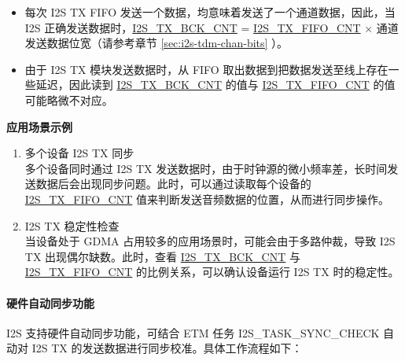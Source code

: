 \documentclass[main\_\_CN.tex]{subfiles}
\begin{document}
\vspace{-0.5em}
\begin{tiplisting}
\vspace{-2em}
\begin{itemize}
    \item 每次 I2S TX FIFO 发送一个数据，均意味着发送了一个通道数据，因此，当 I2S 正确发送数据时，\hyperref[fielddesc:I2STXBCKCNT]{I2S\_TX\_BCK\_CNT} = \hyperref[fielddesc:I2STXFIFOCNT]{I2S\_TX\_FIFO\_CNT} $\times$ 通道发送数据位宽（请参考章节 \ref{sec:i2s-tdm-chan-bits} \textit{}）。
    \item 由于 I2S TX 模块发送数据时，从 FIFO 取出数据到把数据发送至线上存在一些延迟，因此读到 \hyperref[fielddesc:I2STXBCKCNT]{I2S\_TX\_BCK\_CNT} 的值与 \hyperref[fielddesc:I2STXFIFOCNT]{I2S\_TX\_FIFO\_CNT} 的值可能略微不对应。
\end{itemize}
\end{tiplisting}
\vspace{-1em}

\textbf{应用场景示例}
\begin{enumerate}
    \item 多个设备 I2S TX 同步\\
    多个设备同时通过 I2S TX 发送数据时，由于时钟源的微小频率差，长时间发送数据后会出现同步问题。此时，可以通过读取每个设备的 \hyperref[fielddesc:I2STXFIFOCNT]{I2S\_TX\_FIFO\_CNT} 值来判断发送音频数据的位置，从而进行同步操作。
    \item I2S TX 稳定性检查\\
    当设备处于 GDMA 占用较多的应用场景时，可能会由于多路仲裁，导致 I2S TX 出现偶尔缺数。此时，查看 \hyperref[fielddesc:I2STXBCKCNT]{I2S\_TX\_BCK\_CNT} 与 \hyperref[fielddesc:I2STXFIFOCNT]{I2S\_TX\_FIFO\_CNT} 的比例关系，可以确认设备运行 I2S TX 时的稳定性。
\end{enumerate}

\paragraph{硬件自动同步功能}

\chipname{} I2S 支持硬件自动同步功能，可结合 ETM 任务 I2S\_TASK\_SYNC\_CHECK 自动对 I2S TX 的发送数据进行同步校准。具体工作流程如下：
\end{document}
